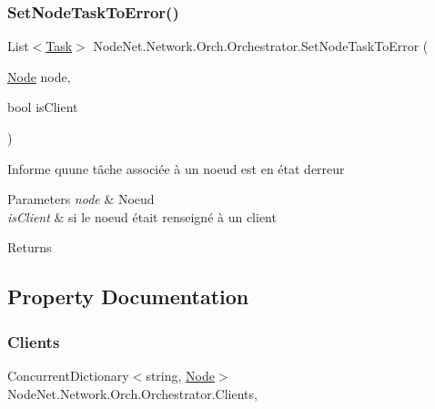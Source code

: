 \subsubsection{\texorpdfstring{Set\+Node\+Task\+To\+Error()}{SetNodeTaskToError()}}
{\footnotesize\ttfamily List$<$\hyperlink{class_node_net_1_1_tasks_1_1_task}{Task}$>$ Node\+Net.\+Network.\+Orch.\+Orchestrator.\+Set\+Node\+Task\+To\+Error (\begin{DoxyParamCaption}\item[{\hyperlink{class_node_net_1_1_network_1_1_nodes_1_1_node}{Node}}]{node,  }\item[{bool}]{is\+Client }\end{DoxyParamCaption})}



Informe qu\textquotesingle{}une tâche associée à un noeud est en état d\textquotesingle{}erreur 


\begin{DoxyParams}{Parameters}
{\em node} & Noeud\\
\hline
{\em is\+Client} & si le noeud était renseigné à un client\\
\hline
\end{DoxyParams}
\begin{DoxyReturn}{Returns}

\end{DoxyReturn}


\subsection{Property Documentation}
\mbox{\label{class_node_net_1_1_network_1_1_orch_1_1_orchestrator_a27d10cf18c1db44d6317065ac38470ef}} 
\subsubsection{\texorpdfstring{Clients}{Clients}}
{\footnotesize\ttfamily Concurrent\+Dictionary$<$string, \hyperlink{class_node_net_1_1_network_1_1_nodes_1_1_node}{Node}$>$ Node\+Net.\+Network.\+Orch.\+Orchestrator.\+Clients\hspace{0.3cm}{\ttfamily [get]}, {\ttfamily [set]}}



